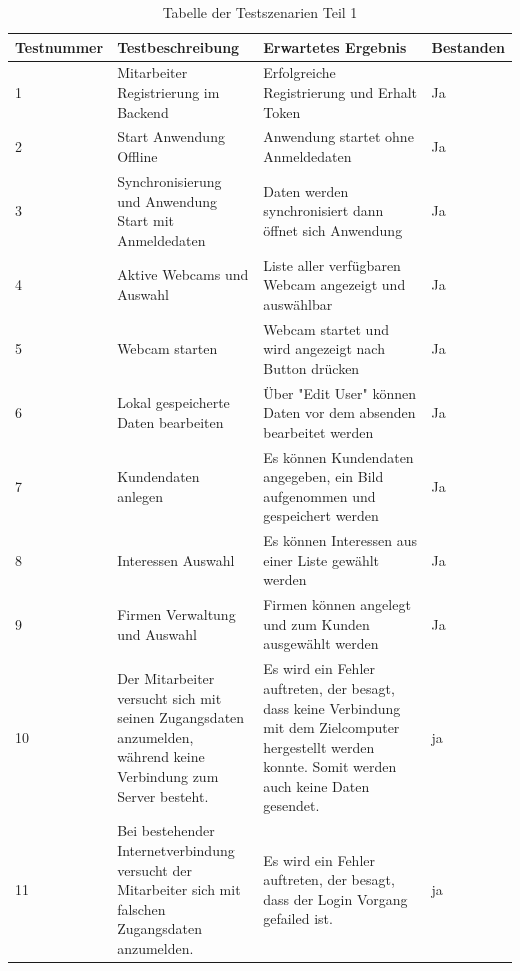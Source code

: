 \begin{table}[h]
	\centering
	\begin{tabular}{|p{0.15\linewidth}|p{0.3\linewidth}|p{0.4\linewidth}|p{0.15\linewidth}|}
		\hline
		Testnummer & Testbeschreibung & Erwartetes Ergebnis & Bestanden \\ \hline
		1 & Mitarbeiter Registrierung im Backend & Erfolgreiche Registrierung und Erhalt Token & Ja\\ \hline
		2 & Start Anwendung Offline & Anwendung startet ohne Anmeldedaten & Ja \\ \hline
		3 & Synchronisierung und Anwendung Start mit Anmeldedaten & Daten werden synchronisiert dann öffnet sich Anwendung & Ja \\ \hline
		4 & Aktive Webcams und Auswahl & Liste aller verfügbaren Webcam angezeigt und auswählbar & Ja \\ \hline
		5 & Webcam starten & Webcam startet und wird angezeigt nach Button drücken & Ja  \\ \hline
		6 & Lokal gespeicherte Daten bearbeiten & Über "Edit User" können Daten vor dem absenden bearbeitet werden & Ja \\ \hline
		7 & Kundendaten anlegen & Es können Kundendaten angegeben, ein Bild aufgenommen und gespeichert werden & Ja \\ \hline
		8 & Interessen Auswahl & Es können Interessen aus einer Liste gewählt werden & Ja \\ \hline
		9 & Firmen Verwaltung und Auswahl & Firmen können angelegt und zum Kunden ausgewählt werden & Ja \\ \hline
		10 & Der Mitarbeiter versucht sich mit seinen Zugangsdaten anzumelden, während keine Verbindung zum Server besteht. & Es wird ein Fehler auftreten, der besagt, dass keine Verbindung mit dem Zielcomputer hergestellt werden konnte. Somit werden auch keine Daten gesendet. & ja \\ \hline
		11 & Bei bestehender Internetverbindung versucht der Mitarbeiter sich mit falschen Zugangsdaten anzumelden. & Es wird ein Fehler auftreten, der besagt, dass der Login Vorgang gefailed ist. & ja \\ \hline
	\end{tabular}
	\caption{Tabelle der Testszenarien Teil 1}
\end{table}

